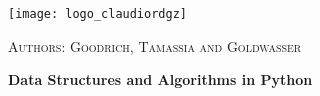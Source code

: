 \newcommand{\HRule}{\rule{\linewidth}{0.2mm}}
\begin{titlepage}
\begin{center}

\begin{LOGOWEBPAGE}
\texttt{[image: logo\_claudiordgz]}
\end{LOGOWEBPAGE}
\begin{navbartext}
	\huge \textsc{Authors: Goodrich, Tamassia and Goldwasser}\\[0.1cm]
\end{navbartext}

\vfill
\begin{navbartext}
	\fontsize{80}{90} \bfseries Data Structures and Algorithms in Python\\[1cm]
\end{navbartext}
\end{center}
\end{titlepage}